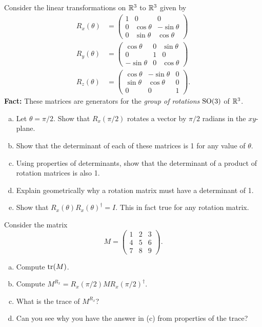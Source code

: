 \documentclass[12pt]{article} %
\begin{document}
\begin{problem}
Consider the linear transformations on $\mathbb{R}^3$ to $\mathbb{R}^3$ given by
\begin{align*}
    R_x(\theta) &= \begin{pmatrix} 1 & 0 & 0 \\ 0 & \cos\theta & -\sin \theta \\ 0 & \sin\theta & \cos \theta \end{pmatrix}\\
    R_y(\theta) &= \begin{pmatrix} \cos \theta & 0 & \sin \theta \\ 0 & 1 & 0 \\ -\sin \theta & 0 & \cos \theta \end{pmatrix}\\
    R_z(\theta) &= \begin{pmatrix} \cos \theta & -\sin \theta & 0 \\ \sin \theta & \cos \theta  & 0 \\ 0 & 0 & 1 \end{pmatrix}.
\end{align*}
\textbf{Fact:} These matrices are generators for the \emph{group of rotations} $\mathrm{SO}(3)$ of $\mathbb{R}^3$.
\begin{enumerate}[(a)]
    \item Let $\theta = \pi/2$. Show that $R_x(\pi/2)$ rotates a vector by $\pi/2$ radians in the $xy$-plane.
    \item Show that the determinant of each of these matrices is 1 for any value of $\theta$.
    \item Using properties of determinants, show that the determinant of a product of rotation matrices is also 1.
    \item Explain geometrically why a rotation matrix must have a determinant of 1.
    \item Show that $R_x(\theta)R_x(\theta)^\dagger = I$. This in fact true for any rotation matrix.
\end{enumerate}
\end{problem}

\begin{problem}
Consider the matrix 
\[
M = \begin{pmatrix} 1 & 2 & 3 \\ 4 & 5 & 6 \\ 7 & 8 & 9 \end{pmatrix}.
\]
\begin{enumerate}[(a)]
    \item Compute $\mathrm{tr}(M)$. 
    \item Compute $M^{R_x}=R_x(\pi/2)MR_x(\pi/2)^\dagger$.
    \item What is the trace of $M^{R_x}$?
    \item Can you see why you have the answer in (c) from properties of the trace?
\end{enumerate}
\end{problem}
\end{document}
